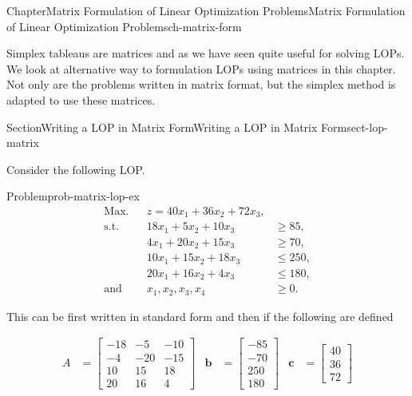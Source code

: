 \documentclass[oneside,10pt,]{book}
\numberwithin{equation}{section}
\newcommand{\amp}{&}
\begin{document}
\begin{chapterptx}{Chapter}{Matrix Formulation of Linear Optimization Problems}{}{Matrix Formulation of Linear Optimization Problems}{}{}{ch-matrix-form}
\renewcommand*{\chaptername}{Chapter}
\begin{introduction}{}%
Simplex tableaus are matrices and as we have seen quite useful for solving LOPs.  We look at alternative way to formulation LOPs using matrices in this chapter.  Not only are the problems written in matrix format, but the simplex method is adapted to use these matrices.%
\end{introduction}%
%
%
\typeout{************************************************}
\typeout{************************************************}
%
\begin{sectionptx}{Section}{Writing a LOP in Matrix Form}{}{Writing a LOP in Matrix Form}{}{}{sect-lop-matrix}
\begin{introduction}{}%
Consider the following LOP.%
\begin{problem}{Problem}{}{prob-matrix-lop-ex}%
%
\begin{equation*}
\begin{aligned} \text{Max.} \amp\amp z = 40 x_1 + 36 x_2 + 72 x_3, \amp \\ \text{s.t.}\amp\amp 18 x_1 + 5 x_2 + 10 x_3 \amp \geq 85, \\ \amp\amp  4 x_1 + 20 x_2 + 15 x_3 \amp \geq 70, \\ \amp\amp10 x_1 + 15 x_2 + 18 x_3 \amp \leq 250, \\ \amp\amp 20 x_1 + 16 x_2 + 4x_3\amp \leq 180, \\ \text{and} \amp\amp x_1, x_2, x_3, x_4 \amp \geq 0.
\end{aligned}
\end{equation*}
%
\end{problem}
This can be first written in standard form and then if the following are defined%
\par
%
\begin{align*}
A \amp = \begin{bmatrix} -18 \amp -5 \amp -10 \\ -4 \amp -20 \amp -15  \\ 10 \amp 15 \amp 18 \\ 20 \amp 16 \amp 4 \end{bmatrix} \amp \boldsymbol{b} \amp  =\begin{bmatrix} -85 \\ -70 \\ 250 \\ 180 \end{bmatrix} \amp \boldsymbol{c} \amp = \begin{bmatrix} 40 \\ 36 \\ 72 \end{bmatrix}

\end{align*}
\end{introduction}
\end{sectionptx}
\end{chapterptx}
\end{document}
